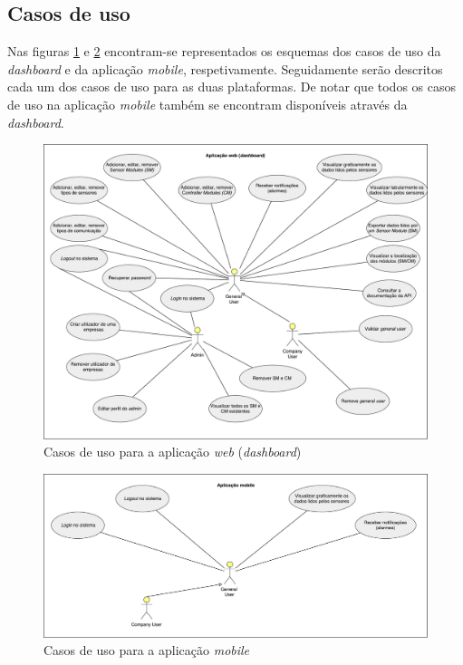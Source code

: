 \subsection{Casos de uso}

Nas figuras \ref{usedash} e \ref{useMobile} encontram-se representados os esquemas dos casos de uso da \textit{dashboard} e da aplicação \textit{mobile}, respetivamente.
Seguidamente serão descritos cada um dos casos de uso para as duas plataformas. De notar que todos os casos de uso na aplicação \textit{mobile} também se encontram disponíveis através da \textit{dashboard}. 



\begin{figure}[!htb]
	\centering
	\includegraphics[width=0.85\linewidth]{esquemas/use-case-web.pdf}
	\caption{Casos de uso para a aplicação \textit{web} (\textit{dashboard}) }
	\label{usedash}
\end{figure}


\newpage


\begin{figure}[!htb]
	\centering
	\includegraphics[width=0.85\linewidth]{esquemas/use-case-mobile.pdf}
	\caption{Casos de uso para a aplicação \textit{mobile}}
	\label{useMobile}
\end{figure}





